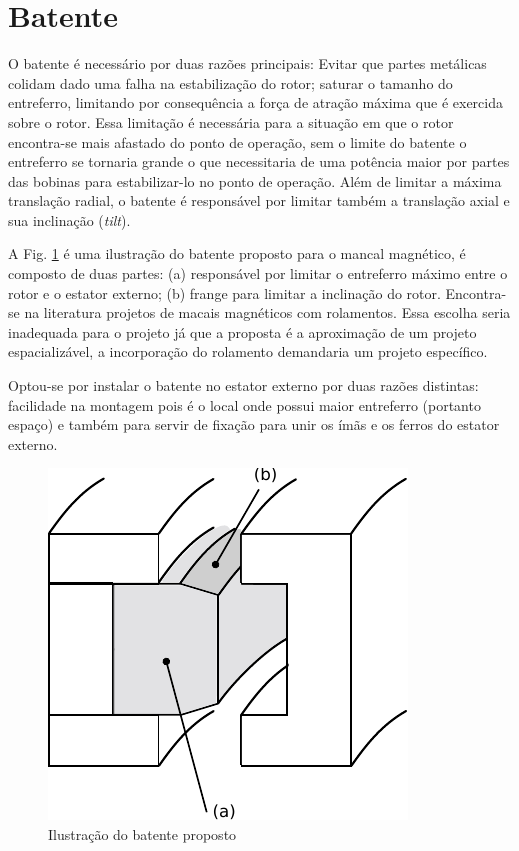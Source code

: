 \section{Batente}

 O batente é necessário por duas razões principais: Evitar que partes metálicas colidam dado uma falha na estabilização do rotor; saturar  o tamanho do entreferro, limitando por consequência a força de atração máxima que é exercida sobre o rotor.  Essa limitação é necessária para a situação em que o rotor encontra-se mais afastado do ponto de operação, sem o limite do batente o entreferro se tornaria grande o que necessitaria de uma potência maior por partes das bobinas para estabilizar-lo no ponto de operação.  Além de limitar a máxima translação radial, o batente é responsável por limitar também a translação axial e sua inclinação (\textit{tilt}).
 
 A Fig. \ref{fig:mancal:batente:corte} é uma ilustração do batente proposto para o mancal magnético, é composto de duas partes: (a) responsável por limitar o entreferro máximo entre o rotor e o estator externo; (b) frange para limitar a inclinação do rotor. Encontra-se na literatura projetos de macais magnéticos com rolamentos. Essa escolha seria inadequada para o projeto já que a proposta é a aproximação de um projeto espacializável, a incorporação do rolamento demandaria um projeto específico.
 
Optou-se por instalar o batente no estator externo por duas razões distintas: facilidade na montagem pois  é o local onde possui maior entreferro (portanto espaço) e também para servir de fixação para unir os ímãs e os ferros do estator externo. 

\begin{figure}[th!]
\centering
\includegraphics[width=0.4\linewidth]{./Figs/mancais/mancal_batente_corte}
\caption{Ilustração do batente proposto}
\label{fig:mancal:batente:corte}
\end{figure}



